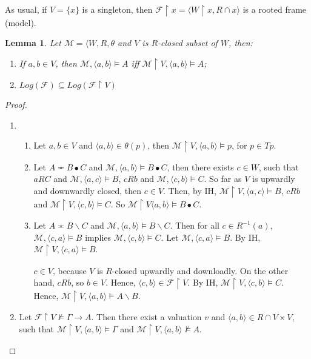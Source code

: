 \documentclass[a4paper]{article}
\theoremstyle{defin}
\theoremstyle{theorem}
\theoremstyle{prop}
\theoremstyle{lemma}
\newtheorem{lemma}{Lemma}
\theoremstyle{ex}
\theoremstyle{col}
\begin{document}
As usual, if $V = \{ x \}$ is a singleton, then $\mathcal{F} \restriction x = \langle W \restriction x, R \cap x \rangle$ is a rooted frame (model).

\begin{lemma}
  Let $\mathcal{M} = \langle W, R, \theta$ and $V$ is $R$-closed subset of $W$, then:
  \begin{enumerate}
    \item If $a, b \in V$, then $\mathcal{M}, \langle a, b \rangle \models A$ iff $\mathcal{M} \restriction V, \langle a, b \rangle \models A$;
    \item $Log(\mathcal{F}) \subseteq Log(\mathcal{F} \restriction V)$
  \end{enumerate}
\end{lemma}

\begin{proof}
  $ $
  \begin{enumerate}
    \item
    \begin{enumerate}
      \item Let $a, b \in V$ and $\langle a, b \rangle \in \theta(p)$, then $\mathcal{M} \restriction V, \langle a, b \rangle \models p$, for $p \in Tp$.
      \item Let $A \eqcirc B \bullet C$ and $\mathcal{M}, \langle a, b \rangle \models B \bullet C$, then
      there exists $c \in W$, such that $a R C$ and $\mathcal{M}, \langle a, c \rangle \models B$, $c R b$ and $\mathcal{M}, \langle c, b \rangle \models C$.
      So far as $V$ is upwardly and downwardly closed, then $c \in V$. Then, by IH, $\mathcal{M} \restriction V , \langle a, c \rangle \models B$, $c R b$ and
      $\mathcal{M} \restriction V, \langle c, b \rangle \models C$. So $\mathcal{M} \restriction V \langle a, b \rangle \models B \bullet C$.
      \item Let $A \eqcirc B \backslash C$ and $\mathcal{M}, \langle a, b \rangle \models B \backslash C$. Then for all $c \in R^{-1}(a)$, $\mathcal{M},
      \langle c, a \rangle \models B$ implies $\mathcal{M}, \langle c, b \rangle \models C$. Let $\mathcal{M}, \langle c, a \rangle \models B$.
      By IH, $\mathcal{M} \restriction V, \langle c, a \rangle \models B$.

      $c \in V$, because $V$ is $R$-closed upwardly and downloadly. On the other hand, $c R b$, so $b \in V$. Hence,
      $\langle c, b \rangle \in \mathcal{F} \restriction V$. By IH, $\mathcal{M} \restriction V, \langle c, b \rangle \models C$. Hence,
      $\mathcal{M} \restriction V, \langle a, b \rangle \models A \backslash B$.
    \end{enumerate}
    \item Let $\mathcal{F} \restriction V\not\models \Gamma \to A$. Then there exist a valuation $v$ and $\langle a, b \rangle \in R \cap V \times V$,
    such that $\mathcal{M} \restriction V, \langle a,b \rangle \models \Gamma$ and $\mathcal{M} \restriction V, \langle a,b \rangle\not\models A$.


\end{enumerate}
\end{proof}
\end{document}
